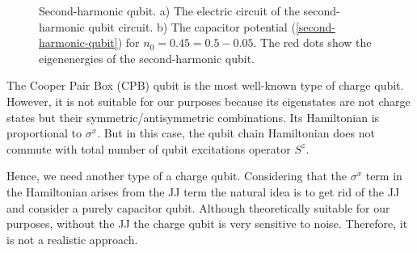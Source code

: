 \documentclass[reprint, aps, prx, amsmath, amssymb, longbibliography, superscriptaddress]{revtex4-2}
\begin{document}
\begin{figure}[t]
    \centering
     \hfill
    \caption{Second-harmonic qubit. a) The electric circuit of the second-harmonic qubit circuit. b) The capacitor potential (\ref{second-harmonic-qubit}) for $n_0 = 0.45 = 0.5 - 0.05 $. The red dots show the eigenenergies of the second-harmonic qubit.}
    \label{fig:second-harmonic-qubit}
\end{figure}


The Cooper Pair Box (CPB) qubit is the most well-known type of charge qubit. However, it is not suitable for our purposes because its eigenstates are not charge states but their symmetric/antisymmetric combinations. Its Hamiltonian is proportional to $\sigma^x$. But in this case, the qubit chain Hamiltonian does not commute with total number of qubit excitations operator $S^z$.

Hence, we need another type of a charge qubit. Considering that the $\sigma^x$ term in the Hamiltonian arises from the JJ term the natural idea is to get rid of the JJ and consider a purely capacitor qubit. Although theoretically suitable for our purposes, without the JJ the charge qubit is very sensitive to noise. Therefore, it is not a realistic approach.
\end{document}
